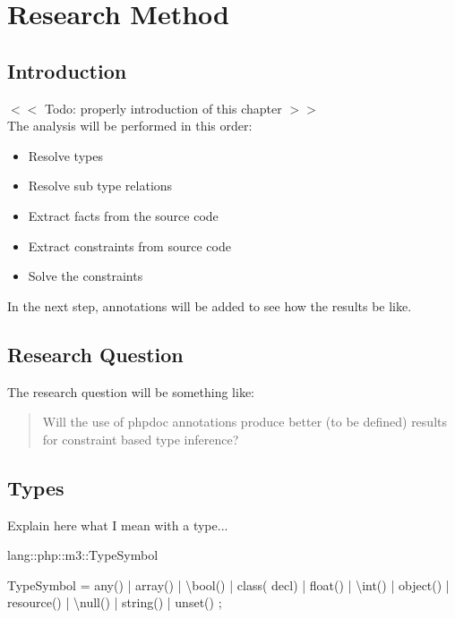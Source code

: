 \documentclass[../main.tex]{subfiles}
\begin{document}
    \chapter{Research Method}\label{chap:research_method}


    \section{Introduction}
    $<<$ Todo: properly introduction of this chapter $>>$
    \\
    The analysis will be performed in this order:
    \begin{itemize}
        \item Resolve types
        \item Resolve sub type relations
        \item Extract facts from the source code
        \item Extract constraints from source code
        \item Solve the constraints
    \end{itemize}
    In the next step, annotations will be added to see how the results be like.
    
    \section{Research Question}
    The research question will be something like: \\
    \begin{quote}
        Will the use of phpdoc annotations produce better (to be defined) results for constraint based type inference?
    \end{quote}


    \section{Types}
    Explain here what I mean with a type...
    
    \begin{rascal}
 lang::php::m3::TypeSymbol

 TypeSymbol
  = any()
  | array()
  | \textbackslash{}bool()
  | class( decl)
  | float()
  | \textbackslash{}int()
  | object()
  | resource()
  | \textbackslash{}null()
  | string()
  | unset()
  ; 
    \end{rascal}
    
\end{document}
